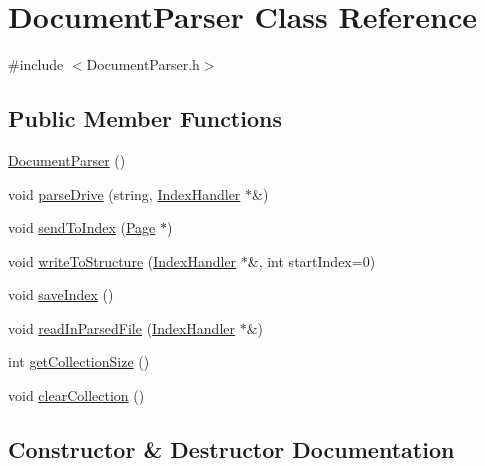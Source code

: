 \hypertarget{class_document_parser}{}\section{Document\+Parser Class Reference}
\label{class_document_parser}


{\ttfamily \#include $<$Document\+Parser.\+h$>$}

\subsection*{Public Member Functions}
\begin{DoxyCompactItemize}
\item 
\hyperlink{class_document_parser_a7a281448c94759450046ab2fb57e7aae}{Document\+Parser} ()
\item 
void \hyperlink{class_document_parser_a40fc3f32cbe2d6f4f978caa42ee509d6}{parse\+Drive} (string, \hyperlink{class_index_handler}{Index\+Handler} $\ast$\&)
\item 
void \hyperlink{class_document_parser_ae132955b8118c74df2705defd1fe856b}{send\+To\+Index} (\hyperlink{class_page}{Page} $\ast$)
\item 
void \hyperlink{class_document_parser_a7ca97302ad273efde7f33163ab9e78dc}{write\+To\+Structure} (\hyperlink{class_index_handler}{Index\+Handler} $\ast$\&, int start\+Index=0)
\item 
void \hyperlink{class_document_parser_a8f07107cbe76401f9db73dbf9cae7a5f}{save\+Index} ()
\item 
void \hyperlink{class_document_parser_a8046232e6026fb59d3052426e7ed7a58}{read\+In\+Parsed\+File} (\hyperlink{class_index_handler}{Index\+Handler} $\ast$\&)
\item 
int \hyperlink{class_document_parser_a23dd86d1fb040662e97845d2499e5ae1}{get\+Collection\+Size} ()
\item 
void \hyperlink{class_document_parser_adb2c732f67e7442edbc99979a3fc9ba6}{clear\+Collection} ()
\end{DoxyCompactItemize}


\subsection{Constructor \& Destructor Documentation}
\hypertarget{class_document_parser_a7a281448c94759450046ab2fb57e7aae}{}

